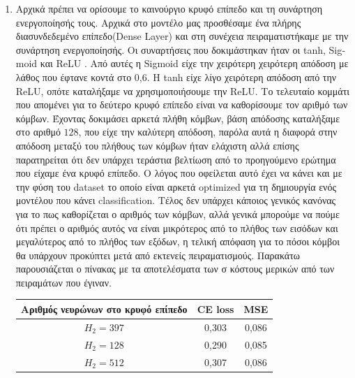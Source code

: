\documentclass[12pt,a4paper]{article}
\newcommand{\tl}{\textlatin}
\begin{document}
\begin{enumerate}[a]
        \item Αρχικά πρέπει να ορίσουμε το καινούργιο κρυφό επίπεδο και τη συνάρτηση ενεργοποίησής τους. Αρχικά στο μοντέλο μας προσθέσαμε ένα πλήρης διασυνδεδεμένο επίπεδο(\tl{Dense Layer}) και στη συνέχεια πειραματιστήκαμε με την συνάρτηση ενεργοποίησής. Οι συναρτήσεις που δοκιμάστηκαν ήταν οι \tl{tanh, Sigmoid} και \tl{ReLU }. Από αυτές η \tl{Sigmoid} είχε την χειρότερη χειρότερη απόδοση με λάθος που έφτανε κοντά στο 0,6. Η \tl{tanh} είχε λίγο χειρότερη απόδοση από την \tl{ReLU}, οπότε καταλήξαμε να χρησιμοποιήσουμε την \tl{ReLU}. Το τελευταίο κομμάτι που απομένει για το δεύτερο κρυφό επίπεδο είναι να καθορίσουμε τον αριθμό των κόμβων. Έχοντας δοκιμάσει αρκετά πλήθη κόμβων, βάση απόδοσης καταλήξαμε στο αριθμό $128$, που είχε την καλύτερη απόδοση, παρόλα αυτά η διαφορά στην απόδοση μεταξύ του πλήθους των κόμβων ήταν ελάχιστη αλλά επίσης παρατηρείται ότι δεν υπάρχει τεράστια βελτίωση από το προηγούμενο ερώτημα που είχαμε ένα κρυφό επίπεδο. Ο λόγος που οφείλεται αυτό έχει να κάνει και με την φύση του \tl{dataset} το οποίο είναι αρκετά \tl{optimized} για τη δημιουργία ενός μοντέλου που κάνει \tl{classification}. Τέλος δεν υπάρχει κάποιος γενικός κανόνας για το πως καθορίζεται ο αριθμός των κόμβων, αλλά γενικά μπορούμε να πούμε ότι πρέπει ο αριθμός αυτός να είναι μικρότερος από το πλήθος των εισόδων και μεγαλύτερος από το πλήθος των εξόδων, η τελική απόφαση για το πόσοι κόμβοι θα υπάρχουν προκύπτει μετά από εκτενείς πειραματισμούς. Παρακάτω παρουσιάζεται ο πίνακας με τα αποτελέσματα των σ κόστους μερικών από των πειραμάτων που έγιναν. \\ 

            \begin{tabular}{|c | c | c | }
                \hline
                Αριθμός νευρώνων στο κρυφό επίπεδο & \tl{CE loss} & \tl{MSE} \\
                \hline
                $H_2 = 397$ & 0,303 & 0,086 \\ 
                $H_2 = 128$ & 0,290 & 0,085 \\ 
                $H_2 = 512$ & 0,307 & 0,086 \\
                \hline 
            \end{tabular} 
            \\


\end{enumerate}
\end{document}
